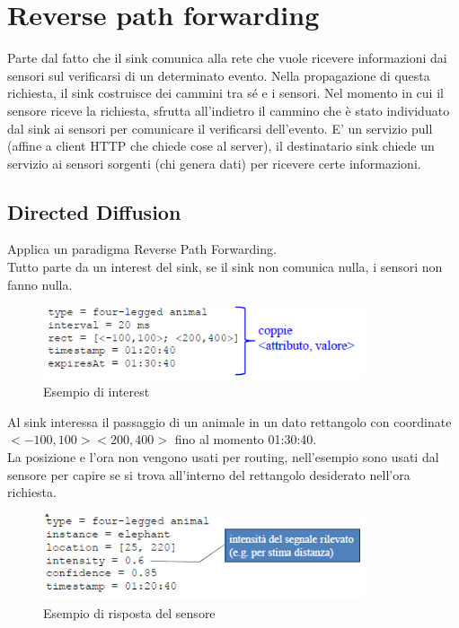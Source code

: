 \documentclass[12pt,italian]{report}
\begin{document}
\section{Reverse path forwarding}
\label{sec:erp}
Parte dal fatto che il sink comunica alla rete che vuole ricevere informazioni dai sensori sul verificarsi di un determinato evento. Nella propagazione di questa richiesta, il sink costruisce dei cammini tra sé e i sensori. Nel momento in cui il sensore riceve la richiesta, sfrutta all'indietro il cammino  che è stato individuato dal sink ai sensori per comunicare il verificarsi dell'evento. 
\bigbreak
E' un servizio pull (affine a client HTTP che chiede cose al server), il destinatario sink chiede un servizio ai sensori sorgenti (chi genera dati) per ricevere certe informazioni. 
\bigbreak
\subsection{Directed Diffusion}
\label{sec:dd}
\noindent Applica un paradigma Reverse Path Forwarding. \\ Tutto parte da un interest del sink, se il sink non comunica nulla, i sensori non fanno nulla. 

\begin{figure}[h]
	\centering
    \includegraphics[width=95mm]{img/dd.PNG}
    \caption{Esempio di interest}
    \label{fig:exint}
\end{figure}

Al sink interessa il passaggio di un animale in un dato rettangolo con coordinate $<-100, 100> <200, 400>$ fino al momento 01:30:40. \\ La posizione e l'ora non vengono usati per routing, nell'esempio sono usati dal sensore per capire se si trova all'interno del rettangolo desiderato nell'ora richiesta.

\begin{figure}[h]
	\centering
    \includegraphics[width=95mm]{img/dd2.PNG}
    \caption{Esempio di risposta del sensore}
    \label{fig:exsens}
\end{figure}
\end{document}
